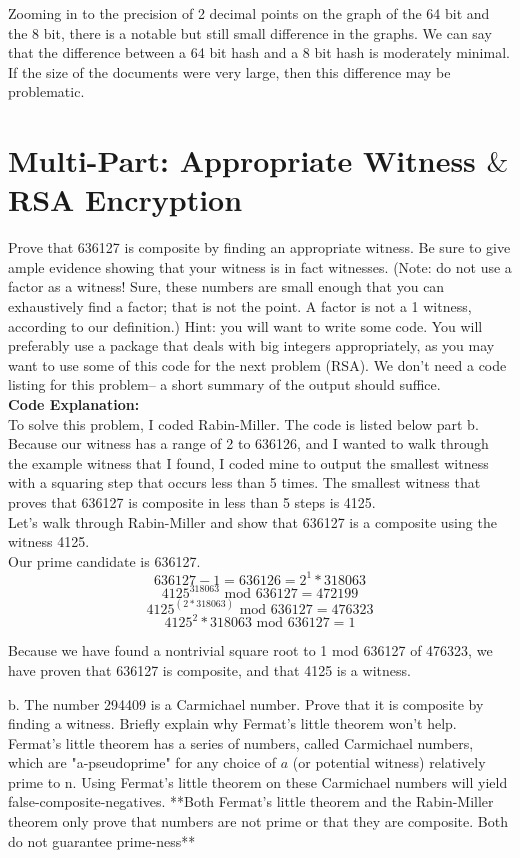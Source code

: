 \documentclass[11pt, solution, letterpaper]{format}
\begin{document}
Zooming in to the precision of 2 decimal points on the graph of the 64 bit and the 8 bit, there is a notable but still small difference in the graphs. We can say that the difference between a 64 bit hash and a 8 bit hash is moderately minimal. If the size of the documents were very large, then this difference may be problematic.
\clearpage
\section{Multi-Part: Appropriate Witness $\&$ RSA Encryption}
Prove that 636127 is composite by finding an appropriate witness. Be sure to give ample evidence showing that your witness is in fact witnesses. (Note: do not use a factor as a witness! Sure, these numbers are small enough that you can exhaustively find a factor; that is not the point. A factor is not a 1 witness, according to our definition.) Hint: you will want to write some code. You will preferably use a
package that deals with big integers appropriately, as you may want to use some of this code for the next
problem (RSA). We don’t need a code listing for this problem– a short summary of the output should
suffice.\\

\textbf{Code Explanation:}\\
To solve this problem, I coded Rabin-Miller. The code is listed below part b. Because our witness has a range of 2 to 636126, and I wanted to walk through the example witness that I found, I coded mine to output the smallest witness with a squaring step that occurs less than 5 times. The smallest witness that proves that 636127 is composite in less than 5 steps is 4125.\\

Let's walk through Rabin-Miller and show that 636127 is a composite using the witness 4125.\\
Our prime candidate is 636127. 
$$636127 - 1 = 636126 = 2^1*318063$$
$$4125^318063 \text{ mod }  636127 = 472199$$
$$4125^(2*318063) \text{ mod }  636127 = 476323$$
$$4125^2*318063 \text{ mod }  636127 = 1$$

Because we have found a nontrivial square root to 1 mod 636127 of 476323, we have proven that 636127 is composite, and that 4125 is a witness.

b.
The number 294409 is a Carmichael number. Prove that it is composite by finding a witness. Briefly
explain why Fermat’s little theorem won’t help.\\

Fermat's little theorem has a series of numbers, called Carmichael numbers, which are "a-pseudoprime" for any choice of $a$ (or potential witness) relatively prime to n. Using Fermat's little theorem on these Carmichael numbers will yield false-composite-negatives. **Both Fermat's little theorem and the Rabin-Miller theorem only prove that numbers are not prime or that they are composite. Both do not guarantee prime-ness**\\
\end{document}
